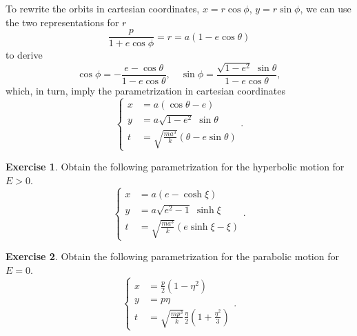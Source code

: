 \documentclass[english,fontsize=11pt,paper=b5]{scrbook}
\theoremstyle{definition}
\newtheorem{exercise}{Exercise}[chapter]
\begin{document}
    To rewrite the orbits in cartesian coordinates, $x = r \cos\phi$, $y=r \sin\phi$, we can use the two representations for $r$
    \begin{equation}
      \frac{p}{1+e\cos\phi} = r = a(1-e\cos\theta)
    \end{equation}
    to derive
    \begin{equation}
      \cos\phi = -\frac{e - \cos\theta}{1-e \cos\theta},\quad
      \sin\phi = \frac{\sqrt{1-e^2}\;\sin\theta}{1-e\cos\theta},
    \end{equation}
    which, in turn, imply the parametrization in cartesian coordinates
    \begin{equation}
      \left\lbrace
        \begin{aligned}
          x & = a(\cos\theta - e)                         \\
          y & = a\sqrt{1-e^2}\;\sin\theta                 \\
          t & = \sqrt{\frac{ma^3}k}(\theta - e\sin\theta)
        \end{aligned}
      \right..
    \end{equation}

    \begin{exercise}
      Obtain the following parametrization for the hyperbolic motion for $E>0$.
      \begin{equation}
        \left\lbrace
          \begin{aligned}
            x & = a(e- \cosh\xi)                     \\
            y & = a\sqrt{e^2-1}\;\sinh\xi            \\
            t & = \sqrt{\frac{ma^3}k}(e\sinh\xi-\xi)
          \end{aligned}
        \right..
      \end{equation}
    \end{exercise}

    \begin{exercise}
      Obtain the following parametrization for the parabolic motion for $E=0$.
      \begin{equation}
        \left\lbrace
          \begin{aligned}
            x & = \frac p2 \left(1- \eta^2\right)                            \\
            y & = p\eta                                                      \\
            t & = \sqrt{\frac{mp^3}k}\frac\eta2\left(1+\frac{\eta^2}3\right)
          \end{aligned}
        \right..
      \end{equation}
    \end{exercise}
\end{document}
